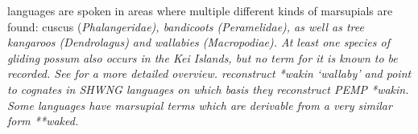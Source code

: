  languages are spoken in areas where
multiple different kinds of marsupials are found: cuscus (\it{Phalangeridae}),
bandicoots (\it{Peramelidae}), as well as tree kangaroos (\it{Dendrolagus}) and wallabies (\it{Macropodiae}).
At least one species of gliding possum also occurs in the Kei
Islands, but no term for it is known to be recorded.
See  for a more detailed overview.
\citet[222]{OsmondPawley2011} reconstruct  *wakin ‘wallaby’
and point to cognates in SHWNG languages on which basis they reconstruct PEMP *wakin.
Some  languages have marsupial terms
which are derivable from a very similar form **waked.
